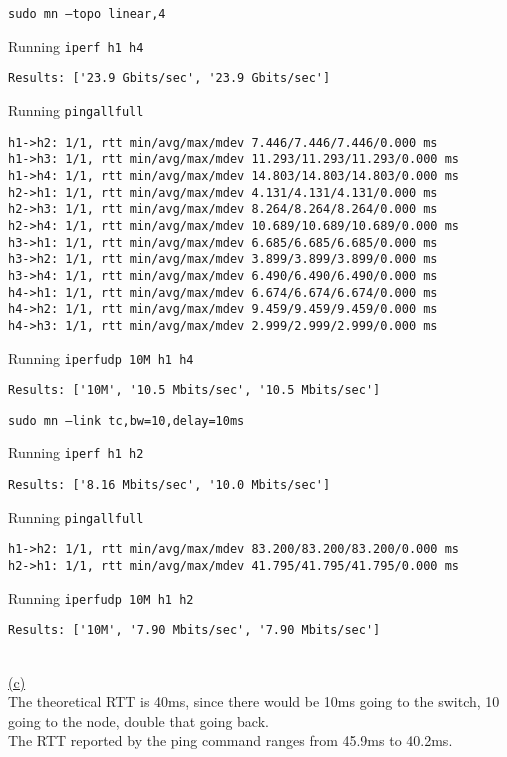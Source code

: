 \documentclass[12pt]{article}
\begin{document}
\texttt{sudo mn --topo linear,4}
\begin{adjustwidth}{10mm}{}
	Running \texttt{iperf h1 h4}
	\begin{verbatim}
Results: ['23.9 Gbits/sec', '23.9 Gbits/sec']
  \end{verbatim}
	Running \texttt{pingallfull}
	\begin{verbatim}
h1->h2: 1/1, rtt min/avg/max/mdev 7.446/7.446/7.446/0.000 ms
h1->h3: 1/1, rtt min/avg/max/mdev 11.293/11.293/11.293/0.000 ms
h1->h4: 1/1, rtt min/avg/max/mdev 14.803/14.803/14.803/0.000 ms
h2->h1: 1/1, rtt min/avg/max/mdev 4.131/4.131/4.131/0.000 ms
h2->h3: 1/1, rtt min/avg/max/mdev 8.264/8.264/8.264/0.000 ms
h2->h4: 1/1, rtt min/avg/max/mdev 10.689/10.689/10.689/0.000 ms
h3->h1: 1/1, rtt min/avg/max/mdev 6.685/6.685/6.685/0.000 ms
h3->h2: 1/1, rtt min/avg/max/mdev 3.899/3.899/3.899/0.000 ms
h3->h4: 1/1, rtt min/avg/max/mdev 6.490/6.490/6.490/0.000 ms
h4->h1: 1/1, rtt min/avg/max/mdev 6.674/6.674/6.674/0.000 ms
h4->h2: 1/1, rtt min/avg/max/mdev 9.459/9.459/9.459/0.000 ms
h4->h3: 1/1, rtt min/avg/max/mdev 2.999/2.999/2.999/0.000 ms
  \end{verbatim}
	Running \texttt{iperfudp 10M h1 h4}
	\begin{verbatim}
Results: ['10M', '10.5 Mbits/sec', '10.5 Mbits/sec']
  \end{verbatim}
\end{adjustwidth}

\texttt{sudo mn --link tc,bw=10,delay=10ms}
\begin{adjustwidth}{10mm}{}
	Running \texttt{iperf h1 h2}
	\begin{verbatim}
Results: ['8.16 Mbits/sec', '10.0 Mbits/sec']
  \end{verbatim}
	Running \texttt{pingallfull}
	\begin{verbatim}
h1->h2: 1/1, rtt min/avg/max/mdev 83.200/83.200/83.200/0.000 ms
h2->h1: 1/1, rtt min/avg/max/mdev 41.795/41.795/41.795/0.000 ms
  \end{verbatim}
	Running \texttt{iperfudp 10M h1 h2}
	\begin{verbatim}
Results: ['10M', '7.90 Mbits/sec', '7.90 Mbits/sec']
  \end{verbatim}
\end{adjustwidth}
~\\\hyperlink{toc}{\hypertarget{6.3}{(c)}}\\
The theoretical RTT is 40ms, since there would be 10ms going to the switch, 10 going to the node, double that going back.\\
The RTT reported by the ping command ranges from 45.9ms to 40.2ms.
\end{document}
